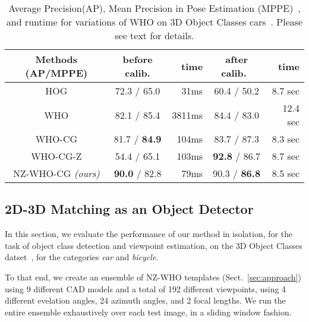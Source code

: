\begin{table}[!htbp]
  \footnotesize
  \setlength{\tabcolsep}{1pt}
  \centering
  \begin{tabular}{|c|c|r|c|r|}
    \hline
    Methods (AP/MPPE) & before calib.  & time & after calib.~\cite{Aubry14} & time \\
    \hline\hline
    HOG\cite{Dalal05}     & 72.3 / 65.0           &  31ms  & 60.4 / 50.2                 & 8.7 sec \\ 
    WHO\cite{Hariharan12} & 82.1 / 85.4           &  3811ms& 84.4 / 83.0                 & 12.4 sec  \\
    WHO-CG                & 81.7 / \textbf{84.9}  &  104ms & 83.7 / 87.3                 & 8.3 sec \\
    WHO-CG-Z              & 54.4 / 65.1           &  103ms & \textbf{92.8} / 86.7        & 8.7 sec  \\
    NZ-WHO-CG {\em (ours)}  & \textbf{90.0} / 82.8  &   79ms & 90.3 / \textbf{86.8}        & 8.5 sec   \\
    \hline
  \end{tabular}
  \caption{Average Precision(AP), Mean Precision in Pose Estimation
    (MPPE)~\cite{Lopez-Sastre11}, and runtime for variations of WHO on
    3D Object Classes cars~\cite{Savarese07}. Please see text for
    details.}
  \label{tab:who_initializations}
\end{table}


\subsection{2D-3D Matching as an Object Detector} 
\label{sec:exp_iso}
In this section, we evaluate the performance of our method in
isolation, for the task of object class detection and viewpoint
estimation, on the 3D Object Classes datset~\cite{Savarese07}, for the
categories {\em car} and {\em bicycle}.

To that end, we create an ensemble of NZ-WHO templates (Sect.~\ref{sec:approach})
using $9$ different CAD models and a total of 192 different
viewpoints, using 4 different evelation angles, 24 azimuth angles,
and 2 focal lengths. We run the entire ensemble exhaustively over
each test image, in a sliding window fashion.

